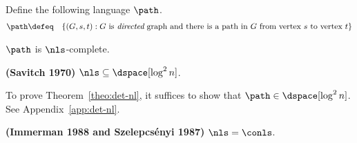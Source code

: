\documentclass[11pt, a4paper]{article}
\begin{document}
Define the following language $\path$.
\begin{eqnarray*}
\path & \defeq & \{ (G,s,t) : G \ \text{is {\em directed} graph and there is a path in $G$ from vertex $s$ to vertex $t$}\}
\end{eqnarray*}


\begin{theorem}
\label{theo:reach-nl-complete}
$\path$ is $\nls$-complete.
\end{theorem}


\begin{theorem}
\label{theo:det-nl}
{\bf (Savitch 1970)}
$\nls \subseteq \dspace [\log^2 n]$.
\end{theorem}

To prove Theorem~\ref{theo:det-nl},
it suffices to show that $\path \in \dspace[\log^2 n]$.
See Appendix~\ref{app:det-nl}.


\begin{theorem}
\label{theo:nl-conl}
{\bf (Immerman 1988 and Szelepcs\'{e}nyi 1987)}
$\nls=\conls$.
\end{theorem}
\end{document}
